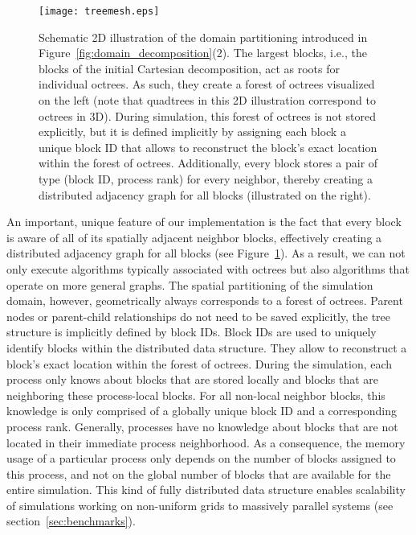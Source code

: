 \documentclass[final,leqno,onefignum,onetabnum]{siamltex1213}
\begin{document}
\begin{figure}[tbp]
  \centering
  \texttt{[image: treemesh.eps]}
  \caption{Schematic 2D illustration of the domain partitioning introduced in Figure~\ref{fig:domain_decomposition}(2).
The largest blocks, i.e., the blocks of the initial Cartesian decomposition, act as roots for individual octrees.
As such, they create a forest of octrees visualized on the left (note that quadtrees in this 2D illustration correspond to octrees in 3D).
During simulation, this forest of octrees is not stored explicitly,
but it is defined implicitly by assigning each block a unique block ID that allows to reconstruct the block's exact location within the forest of octrees.
Additionally, every block stores a pair of type (block ID, process rank) for every neighbor,
thereby creating a distributed adjacency graph for all blocks (illustrated on the right).}
  \label{fig:treemesh}
\end{figure}

An important, unique feature of our implementation is the fact that every block is aware of all of its spatially adjacent neighbor blocks,
effectively creating a distributed adjacency graph for all blocks (see Figure~\ref{fig:treemesh}).
As a result, we can not only execute algorithms typically associated with octrees but also algorithms that operate on more general graphs.
The spatial partitioning of the simulation domain, however, geometrically always corresponds to a forest of octrees.
Parent nodes or parent-child relationships do not need to be saved explicitly, the tree structure is implicitly defined by block IDs.
Block IDs are used to uniquely identify blocks within the distributed data structure.
They allow to reconstruct a block's exact location within the forest of octrees.
During the simulation, each process only knows about blocks that are stored locally and blocks that are neighboring these process-local blocks.
For all non-local neighbor blocks, this knowledge is only comprised of a globally unique block ID and a corresponding process rank.
Generally, processes have no knowledge about blocks that are not located in their immediate process neighborhood.
As a consequence, the memory usage of a particular process only depends on the number of blocks assigned to this process,
and not on the global number of blocks that are available for the entire simulation.
This kind of fully distributed data structure
enables scalability of simulations working on non-uniform grids to massively parallel systems (see section~\ref{sec:benchmarks}).
\end{document}
